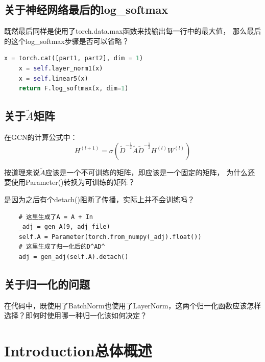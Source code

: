 \documentclass[AutoFakeBold]{MyFormat}
\begin{document}
\section{关于神经网络最后的log\_softmax}
\par 既然最后同样是使用了torch.data.max函数来找输出每一行中的最大值，
那么最后的这个log\_softmax步骤是否可以省略？
\begin{lstlisting}[language=python]
    x = torch.cat([part1, part2], dim = 1)
    x = self.layer_norm1(x)
    x = self.linear5(x)
    return F.log_softmax(x, dim=1)
\end{lstlisting}


\section{关于$\tilde A$矩阵}
\par 在GCN的计算公式中：
\begin{equation}
    H^{(l+1)} = \sigma(\tilde D^{-\frac{1}{2}}\tilde A
    \tilde D^{-\frac{1}{2}}H^{(l)}W^{(l)})
\end{equation}
\par 按道理来说$\tilde A$应该是一个不可训练的矩阵，即应该是一个固定的矩阵，
为什么还要使用Parameter()转换为可训练的矩阵？
\par 是因为之后有个detach()阻断了传播，实际上并不会训练吗？
\begin{lstlisting}
    # 这里生成了A = A + In
    _adj = gen_A(9, adj_file)
    self.A = Parameter(torch.from_numpy(_adj).float())
    # 这里生成了归一化后的D^AD^
    adj = gen_adj(self.A).detach()
\end{lstlisting}


\section{关于归一化的问题}
\par 在代码中，既使用了BatchNorm也使用了LayerNorm，这两个归一化函数应该怎样
选择？即何时使用哪一种归一化该如何决定？



\chapter{Introduction总体概述}
\end{document}
